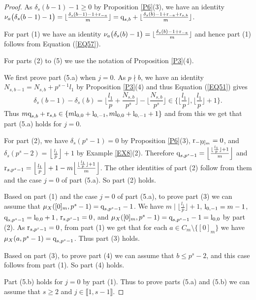 \documentclass[11pt]{amsart}
\def\l{\textup{l}}
\def\r{\textup{r}}
\def\q{\textup{q}}
\begin{document}
\begin{proof}
As $\delta_s(b-1)-1\ge 0$ by Proposition \ref{P6}(3), we have an identity $\nu_a\bigl(\delta_s(b-1)-1\bigr)=\lfloor\frac{\delta_s(b-1)-1+\r_{-a}}{m}\rfloor=\q_{s,b}+\lfloor\frac{\delta_s(b)-1+\r_{-a}+\r_{s,b}}{m}\rfloor$. 

For part (1) we have an identity $\nu_a\bigl(\delta_s(b)-1\bigr)=\lfloor\frac{\delta_s(b)-1+\r_{-a}}{m}\rfloor$ and hence part (1) follows from Equation (\ref{EQ57}).

For parts (2) to (5) we use the notation of Proposition \ref{P3}(4). 

We first prove part (5.a) when $j=0$. As $p\nmid b$, we have an identity $N_{s,b-1}=N_{s,b}+p^{s-1}l_1$ by Proposition \ref{P3}(4) and thus Equation (\ref{EQ51}) gives
\begin{equation}\label{EQ60}
\delta_s(b-1)-\delta_s(b)=\Big\lfloor\frac{l_1}{p}+\frac{N_{s,b}}{p^s}\Big\rfloor-\Big\lfloor\frac{N_{s,b}}{p^s}\Big\rfloor\in\Big\{\Big\lfloor\frac{l_1}{p}\Big\rfloor,\Big\lfloor\frac{l_1}{p}\Big\rfloor+1\Big\}.
\end{equation}
Thus $m\q_{s,b}+\r_{s,b}\in\{m\l_{0,0}+\l_{0,-1},m\l_{0,0}+\l_{0,-1}+1\}$ and from this we get that part (5.a) holds for $j=0$.

For part (2), we have $\delta_s(p^s-1)=0$ by Proposition \ref{P6}(3), $\r_{-[0]_m}=0$, and $\delta_s(p^s-2)=\left\lfloor \frac{l_1}{p}\right\rfloor+1$ by Example \ref{EX8}(2). Therefore $\q_{s,p^s-1}=\Big\lfloor\frac{\lfloor \frac{l_1}{p}\rfloor+1}{m}\Big\rfloor$ and $\r_{s,p^s-1}=\Big\lfloor \frac{l_1}{p}\Big\rfloor+1-m\Big\lfloor\frac{\lfloor \frac{l_1}{p}\rfloor+1}{m}\Big\rfloor$. The other identities of part (2) follow from them and the case $j=0$ of part (5.a). So part (2) holds. 

Based on part (1) and the case $j=0$ of part (5.a), to prove part (3) we can assume that $\mu_X([0]_m,p^s-1)=\q_{s,p^s-1}-1$. We have $m\mid\lfloor \frac{l_1}{p}\rfloor+1$, $\l_{0,-1}=m-1$, $\q_{s,p^s-1}=\l_{0,0}+1$, $\r_{s,p^s-1}=0$, and $\mu_X([0]_m,p^s-1)=\q_{s,p^s-1}-1=\l_{0,0}$ by part (2).  As $\r_{s,p^s-1}=0$, from part (1) we get that for each $a\in C_m\setminus\{[0]_m\}$ we have $\mu_X(a,p^s-1)=\q_{s,p^s-1}$. Thus part (3) holds.

Based on part (3), to prove part (4) we can assume that $b\le p^s-2$, and this case follows from part (1). So part (4) holds. 

Part (5.b) holds for $j=0$ by part (1). Thus to prove parts (5.a) and (5.b) we can assume that $s\ge 2$ and $j\in\llbracket1,s-1\rrbracket$. 


\end{proof}
\end{document}
